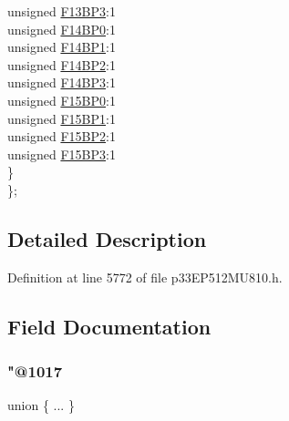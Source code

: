 \begin{DoxyCompactItemize}
\begin{tabbing}
\>\>unsigned \hyperlink{structtag_c2_b_u_f_p_n_t4_b_i_t_s_a36ec0637bd7ec69bb46cacb8be55e411}{F13BP3}:1\\
\>\>unsigned \hyperlink{structtag_c2_b_u_f_p_n_t4_b_i_t_s_aa37d136d5947ea8782cb51f88ebc5caa}{F14BP0}:1\\
\>\>unsigned \hyperlink{structtag_c2_b_u_f_p_n_t4_b_i_t_s_a8f8fc7abccca67239e2dac28160d276e}{F14BP1}:1\\
\>\>unsigned \hyperlink{structtag_c2_b_u_f_p_n_t4_b_i_t_s_a0689d3aab79ec566e3b3c2678f3a7f16}{F14BP2}:1\\
\>\>unsigned \hyperlink{structtag_c2_b_u_f_p_n_t4_b_i_t_s_ac8112a071e0688c1a8238bf110d37050}{F14BP3}:1\\
\>\>unsigned \hyperlink{structtag_c2_b_u_f_p_n_t4_b_i_t_s_acabf8c57112df4f8428962687e5fd7ff}{F15BP0}:1\\
\>\>unsigned \hyperlink{structtag_c2_b_u_f_p_n_t4_b_i_t_s_a56067c982d223515618c2f4439ae1bbb}{F15BP1}:1\\
\>\>unsigned \hyperlink{structtag_c2_b_u_f_p_n_t4_b_i_t_s_ae990b3695ab0175cd7a80ffada713ec7}{F15BP2}:1\\
\>\>unsigned \hyperlink{structtag_c2_b_u_f_p_n_t4_b_i_t_s_a83963b21ba4820db13db6f7a67ed2398}{F15BP3}:1\\
\>\} \\
\}; \\

\end{tabbing}\end{DoxyCompactItemize}


\subsection{Detailed Description}


Definition at line 5772 of file p33\+E\+P512\+M\+U810.\+h.



\subsection{Field Documentation}
\mbox{\label{structtag_c2_b_u_f_p_n_t4_b_i_t_s_a3e9c98a999c0dcc0ca082959d6b5db44}} 
\subsubsection{\texorpdfstring{"@1017}{@1017}}
{\footnotesize\ttfamily union \{ ... \} }

